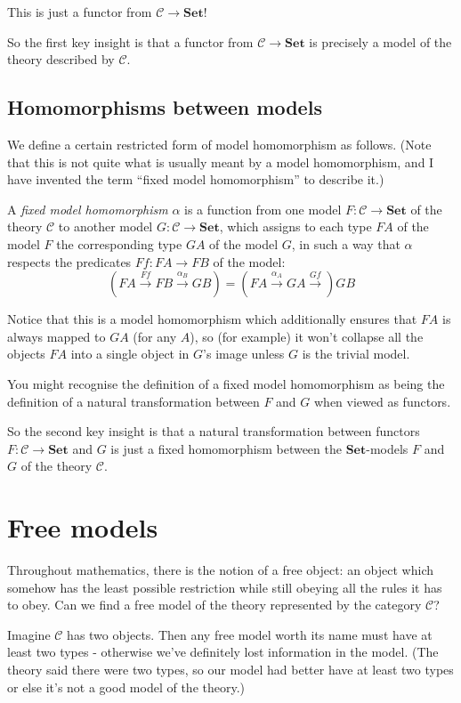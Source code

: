 \documentclass[11pt]{amsart}
\newcommand{\Set}{\mathbf{Set}}
\begin{document}
    This is just a functor from $\mathcal{C} \to \Set$!

    So the first key insight is that a functor from $\mathcal{C} \to \Set$ is precisely a model of the theory described by $\mathcal{C}$.

    \subsection{Homomorphisms between models}

    We define a certain restricted form of model homomorphism as follows.
    (Note that this is not quite what is usually meant by a model homomorphism, and I have invented the term ``fixed model homomorphism'' to describe it.)
    
    A \emph{fixed model homomorphism} $\alpha$ is a function from one model $F: \mathcal{C} \to \Set$ of the theory $\mathcal{C}$ to another model $G: \mathcal{C} \to \Set$, which assigns to each type $FA$ of the model $F$ the corresponding type $GA$ of the model $G$, in such a way that $\alpha$ respects the predicates $Ff: FA \to FB$ of the model:
    $$(FA \xrightarrow{Ff} FB \xrightarrow{\alpha_B} GB) = (FA \xrightarrow{\alpha_A} GA \xrightarrow{Gf}) GB$$

Notice that this is a model homomorphism which additionally ensures that $FA$ is always mapped to $GA$ (for any $A$), so (for example) it won't collapse all the objects $FA$ into a single object in $G$'s image unless $G$ is the trivial model.

    You might recognise the definition of a fixed model homomorphism as being the definition of a natural transformation between $F$ and $G$ when viewed as functors.

    So the second key insight is that a natural transformation between functors $F: \mathcal{C} \to \Set$ and $G$ is just a fixed homomorphism between the $\Set$-models $F$ and $G$ of the theory $\mathcal{C}$.

    \section{Free models}
    Throughout mathematics, there is the notion of a free object: an object which somehow has the least possible restriction while still obeying all the rules it has to obey.
    Can we find a free model of the theory represented by the category $\mathcal{C}$?

    Imagine $\mathcal{C}$ has two objects. Then any free model worth its name must have at least two types - otherwise we've definitely lost information in the model.
    (The theory said there were two types, so our model had better have at least two types or else it's not a good model of the theory.)
\end{document}
